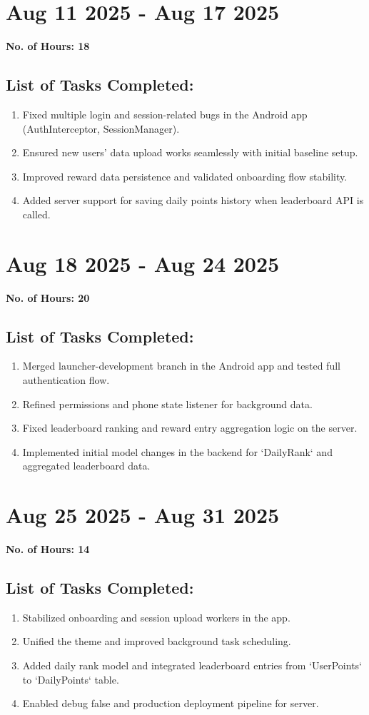 \documentclass[12pt]{article}
\begin{document}
    \section{Aug 11 2025 - Aug 17 2025}
    {\bf No. of Hours: 18}
    \subsection{List of Tasks Completed:}
    \begin{enumerate}
        \item Fixed multiple login and session-related bugs in the Android app (AuthInterceptor, SessionManager).
        \item Ensured new users’ data upload works seamlessly with initial baseline setup.
        \item Improved reward data persistence and validated onboarding flow stability.
        \item Added server support for saving daily points history when leaderboard API is called.
    \end{enumerate}
    
    \section{Aug 18 2025 - Aug 24 2025}
    {\bf No. of Hours: 20}
    \subsection{List of Tasks Completed:}
    \begin{enumerate}
        \item Merged launcher-development branch in the Android app and tested full authentication flow.
        \item Refined permissions and phone state listener for background data.
        \item Fixed leaderboard ranking and reward entry aggregation logic on the server.
        \item Implemented initial model changes in the backend for `DailyRank` and aggregated leaderboard data.
    \end{enumerate}
    
    \section{Aug 25 2025 - Aug 31 2025}
    {\bf No. of Hours: 14}
    \subsection{List of Tasks Completed:}
    \begin{enumerate}
        \item Stabilized onboarding and session upload workers in the app.
        \item Unified the theme and improved background task scheduling.
        \item Added daily rank model and integrated leaderboard entries from `UserPoints` to `DailyPoints` table.
        \item Enabled debug false and production deployment pipeline for server.
    \end{enumerate}
    
\end{document}
